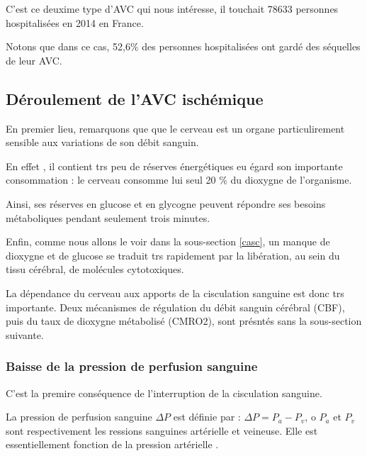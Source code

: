 C'est ce deuxime type d'AVC qui nous int\'eresse, il touchait 78633 personnes hospitalis\'ees en 2014 en France.

\par
Notons que dans ce cas, 52,6\% des personnes hospitalis\'ees ont gard\'e des s\'equelles de leur AVC.


\subsection{D\'eroulement de l'AVC isch\'emique}

En premier lieu, remarquons que  que le cerveau est un organe particulirement sensible aux variations de son d\'ebit sanguin.

\par
En effet \cite{pat_neu}, il contient trs peu de r\'eserves \'energ\'etiques eu \'egard son importante consommation : %
le cerveau consomme  lui seul 20 \% du dioxygne de l'organisme.

\par
Ainsi, ses r\'eserves en glucose et en glycogne peuvent r\'epondre  ses besoins m\'etaboliques pendant seulement trois minutes.

\par
Enfin, comme nous allons le voir dans la sous-section \ref{casc}, un manque de dioxygne et de glucose se traduit trs rapidement par la lib\'eration, %
au sein du tissu c\'er\'ebral, de mol\'ecules cytotoxiques.

\etoile
La d\'ependance du cerveau aux apports de la cisculation sanguine est donc trs importante. %
Deux m\'ecanismes de r\'egulation du d\'ebit sanguin c\'er\'ebral (CBF), puis du taux de dioxygne m\'etabolis\'e (CMRO2), sont pr\'esnt\'es sans la sous-section suivante.

\subsubsection{Baisse de la pression de perfusion sanguine}

C'est la premire cons\'equence de l'interruption de la cisculation sanguine.

\par
La pression de perfusion sanguine $\Delta P$ est d\'efinie par : $\Delta P = P_a - P_v$, o $P_a$ et $P_v$ sont respectivement les ressions sanguines art\'erielle et veineuse. %
Elle est essentiellement fonction de la pression art\'erielle \cite{vib_dsc}.

